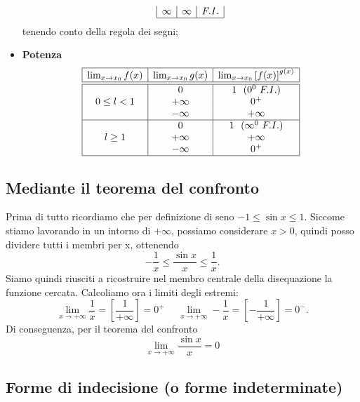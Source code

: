 \documentclass{book}     %
\begin{document}
\begin{shadedTheorem}
\begin{itemize}
\[\begin{array}{|c|c|c|}
                \infty & \infty & F. I. \\\hline
            \end{array}\]
            tenendo conto della regola dei segni;
            \item \textbf{Potenza}
            \[\begin{array}{|c|c|c|}
                \hline
                \lim_{x\to x_0}f(x)& \lim_{x\to x_0}g(x)& \lim_{x\to x_0}\left[ f(x) \right]^{g(x)} \\ \hline\hline
                            & 0         & 1  ~~(0^0~ F.I.)  \\
                0\leq l < 1 &  +\infty  & 0^+    \\
                            & -\infty   & +\infty    \\\hline
                            & 0         & 1 ~~(\infty^0~F.I.) \\
                l\geq 1     & +\infty   & +\infty     \\
                            & -\infty   & 0^+     \\\hline
            \end{array}\]
        \end{itemize}
\end{shadedTheorem}


\subsection{Mediante il teorema del confronto}

\begin{ex}
    Prima di tutto ricordiamo che per definizione di seno $-1\leq \sin x \leq 1$. Siccome stiamo lavorando in un intorno di $+\infty$, possiamo considerare $x>0$, quindi posso dividere tutti i membri per x, ottenendo \[-\frac{1}{x}\leq \frac{\sin x}{x}\leq \frac{1}{x}.\] Siamo quindi riusciti a ricostruire nel membro centrale della disequazione la funzione cercata. Calcoliamo ora i limiti degli estremi:
    \[\lim_{x\to +\infty}\frac{1}{x}=\left[\frac{1}{+\infty}\right]=0^+ ~~~~~~
    \lim_{x\to +\infty}-\frac{1}{x}=\left[-\frac{1}{+\infty}\right]=0^-.\]
    Di conseguenza, per il teorema del confronto \[\lim_{x\to + \infty} \frac{\sin x}{x}=0\]
\end{ex}

\subsection{Forme di indecisione (o forme indeterminate)}
\end{document}
